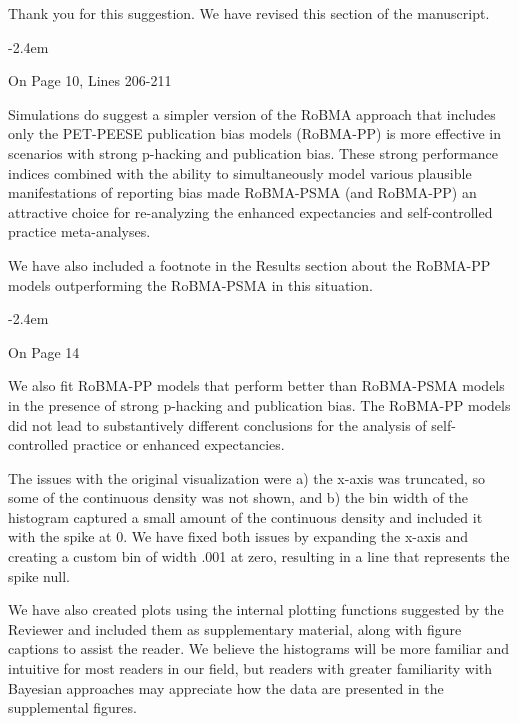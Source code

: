 \documentclass[final]{article}
\renewenvironment{quote}{\begin{fquote}\advance\leftmargini -2.4em\begin{oldquote}}{\end{oldquote}\end{fquote}}
\newenvironment{fquote}
  {\def\FrameCommand{
	\fboxsep=0.6em %
	\fcolorbox{black}{white}}%
    \MakeFramed {\advance\hsize-2\width \FrameRestore}
    \begin{minipage}{\linewidth}
  }
  {\end{minipage}\endMakeFramed}
\begin{document}

Thank you for this suggestion. We have revised this section of the manuscript.

\begin{quote}
On Page 10, Lines 206-211

Simulations do suggest a simpler version of the RoBMA approach that includes only the PET-PEESE publication bias models (RoBMA-PP) is more effective in scenarios with strong p-hacking and publication bias. These strong performance indices combined with the ability to simultaneously model various plausible manifestations of reporting bias made RoBMA-PSMA (and RoBMA-PP) an attractive choice for re-analyzing the enhanced expectancies and self-controlled practice meta-analyses.
\end{quote}

We have also included a footnote in the Results section about the RoBMA-PP models outperforming the RoBMA-PSMA in this situation.

\begin{quote}
On Page 14

We also fit RoBMA-PP models that perform better than RoBMA-PSMA models in the presence of strong p-hacking and publication bias. The RoBMA-PP models did not lead to substantively different conclusions for the analysis of self-controlled practice or enhanced expectancies.
\end{quote}


The issues with the original visualization were a) the x-axis was truncated, so some of the continuous density was not shown, and b) the bin width of the histogram captured a small amount of the continuous density and included it with the spike at 0. We have fixed both issues by expanding the x-axis and creating a custom bin of width .001 at zero, resulting in a line that represents the spike null.

We have also created plots using the internal plotting functions suggested by the Reviewer and included them as supplementary material, along with figure captions to assist the reader. We believe the histograms will be more familiar and intuitive for most readers in our field, but readers with greater familiarity with Bayesian approaches may appreciate how the data are presented in the supplemental figures.
\end{document}
